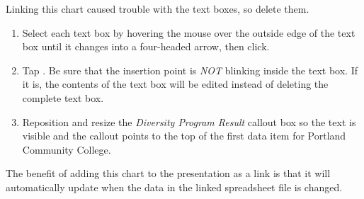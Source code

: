 Linking this chart caused trouble with the text boxes, so delete them.

\begin{enumbox}
	\begin{enumerate}
		\item Select each text box by hovering the mouse over the outside edge of the text box until it changes into a four-headed arrow, then click.
		\item Tap . Be sure that the insertion point is \textit{NOT} blinking inside the text box. If it is, the contents of the text box will be edited instead of deleting the complete text box.
		\item Reposition and resize the \textit{Diversity Program Result} callout box so the text is visible and the callout points to the top of the first data item for Portland Community College.
	\end{enumerate}
\end{enumbox}
	
The benefit of adding this chart to the presentation as a link is that it will automatically update when the data in the linked spreadsheet file is changed.

